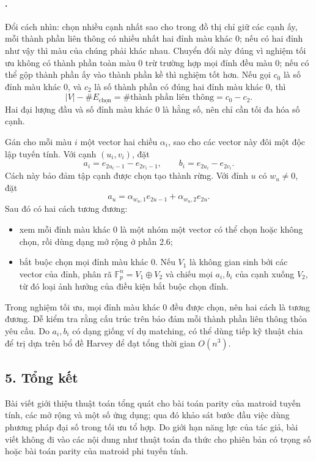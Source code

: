 \documentclass[11pt]{article}
\begin{document}
\paragraph{.}
Đổi cách nhìn: chọn nhiều cạnh nhất sao cho trong đồ thị chỉ giữ các cạnh ấy,
mỗi thành phần liên thông có nhiều nhất hai đỉnh màu khác \(0\); nếu có hai đỉnh
như vậy thì màu của chúng phải khác nhau. Chuyển đổi này đúng vì nghiệm tối ưu
không có thành phần toàn màu \(0\) trừ trường hợp mọi đỉnh đều màu \(0\); nếu có
thể gộp thành phần ấy vào thành phần kề thì nghiệm tốt hơn. Nếu gọi \(c_0\) là
số đỉnh màu khác \(0\), và \(c_2\) là số thành phần có đúng hai đỉnh màu khác
\(0\), thì
\[
  |V|-\#E_{\text{chọn}}=\#\text{thành phần liên thông}=c_0-c_2.
\]
Hai đại lượng đầu và số đỉnh màu khác \(0\) là hằng số, nên chỉ cần tối đa hóa
số cạnh.

Gán cho mỗi màu \(i\) một vector hai chiều \(\alpha_i\), sao cho các vector này
đôi một độc lập tuyến tính. Với cạnh \((u_i,v_i)\), đặt
\[
  a_i=e_{2u_i-1}-e_{2v_i-1},\qquad
  b_i=e_{2u_i}-e_{2v_i}.
\]
Cách này bảo đảm tập cạnh được chọn tạo thành rừng. Với đỉnh \(u\) có
\(w_u\ne0\), đặt
\[
  a_u=\alpha_{w_u,1}e_{2u-1}+\alpha_{w_u,2}e_{2u}.
\]
Sau đó có hai cách tương đương:
\begin{itemize}
  \item xem mỗi đỉnh màu khác \(0\) là một nhóm một vector có thể chọn hoặc
  không chọn, rồi dùng dạng mở rộng ở phần 2.6;
  \item bắt buộc chọn mọi đỉnh màu khác \(0\). Nếu \(V_1\) là không gian sinh
  bởi các vector của đỉnh, phân rã \(\mathbb F_p^n=V_1\oplus V_2\) và chiếu mọi
  \(a_i,b_i\) của cạnh xuống \(V_2\), từ đó loại ảnh hưởng của điều kiện bắt
  buộc chọn đỉnh.
\end{itemize}
Trong nghiệm tối ưu, mọi đỉnh màu khác \(0\) đều được chọn, nên hai cách là
tương đương. Dễ kiểm tra rằng cấu trúc trên bảo đảm mỗi thành phần liên thông
thỏa yêu cầu. Do \(a_i,b_i\) có dạng giống ví dụ matching, có thể dùng tiếp kỹ
thuật chia để trị dựa trên bổ đề Harvey để đạt tổng thời gian \(O(n^3)\).

\subsection*{5. Tổng kết}

Bài viết giới thiệu thuật toán tổng quát cho bài toán parity của matroid tuyến
tính, các mở rộng và một số ứng dụng; qua đó khảo sát bước đầu việc dùng phương
pháp đại số trong tối ưu tổ hợp. Do giới hạn năng lực của tác giả, bài viết
không đi vào các nội dung như thuật toán đa thức cho phiên bản có trọng số hoặc
bài toán parity của matroid phi tuyến tính.
\end{document}
